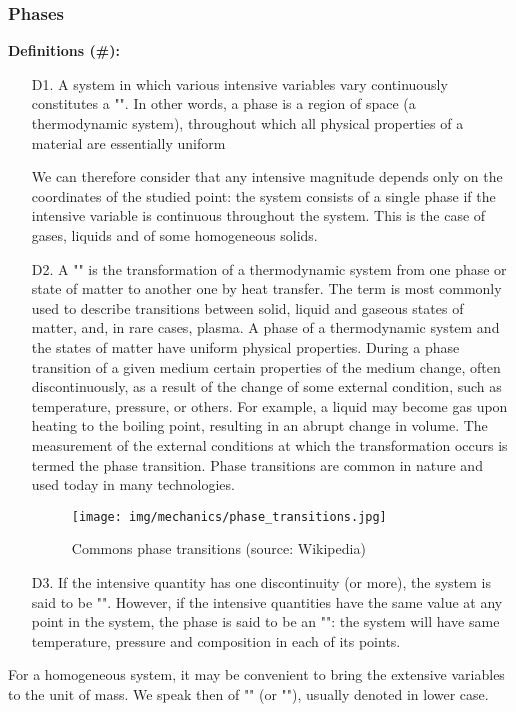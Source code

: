 	\subsubsection{Phases}
	\textbf{Definitions (\#\mydef):} 
	\begin{enumerate}
		\item[D1.] A system in which various intensive variables vary continuously constitutes a "". In other words,  a phase is a region of space (a thermodynamic system), throughout which all physical properties of a material are essentially uniform
	
	We can therefore consider that any intensive magnitude depends only on the coordinates of the studied point: the system consists of a single phase if the intensive variable is continuous throughout the system. This is the case of gases, liquids and of some homogeneous solids.

		\item[D2.] A "" is the transformation of a thermodynamic system from one phase or state of matter to another one by heat transfer. The term is most commonly used to describe transitions between solid, liquid and gaseous states of matter, and, in rare cases, plasma. A phase of a thermodynamic system and the states of matter have uniform physical properties. During a phase transition of a given medium certain properties of the medium change, often discontinuously, as a result of the change of some external condition, such as temperature, pressure, or others. For example, a liquid may become gas upon heating to the boiling point, resulting in an abrupt change in volume. The measurement of the external conditions at which the transformation occurs is termed the phase transition. Phase transitions are common in nature and used today in many technologies.
		\begin{figure}[H]
			\centering
			\texttt{[image: img/mechanics/phase\_transitions.jpg]}
			\caption{Commons phase transitions (source: Wikipedia)}
		\end{figure}

		\item[D3.] If the intensive quantity has one discontinuity (or more), the system is said to be "". However, if the intensive quantities have the same value at any point in the system, the phase is said to be an "": the system will have same temperature, pressure and composition in each of its points.
	\end{enumerate}
	For a homogeneous system, it may be convenient to bring the extensive variables to the unit of mass. We speak then of "" (or ""), usually denoted in lower case.

